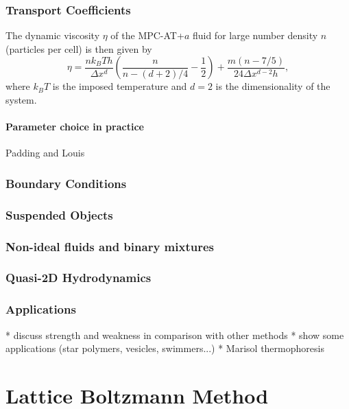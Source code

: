 \documentclass[8.5pt,twoside,twocolumn]{article}
\begin{document}
\subsubsection{Transport Coefficients}

The dynamic viscosity $\eta$ of the MPC-AT+$a$ fluid for large number density $n$ (particles per cell) is then given by
%
\begin{equation}
\eta = \frac{n k_BT h}{\Delta x^d} \left( \frac{n}{n-(d+2)/4}-\frac{1}{2} \right)
+ \frac{m (n-7/5)}{24 \Delta x^{d-2} h} ,
\end{equation}
%
where $k_BT$ is the imposed temperature and $d=2$ is the dimensionality of the system.


\paragraph{Parameter choice in practice}

Padding and Louis

\subsubsection{Boundary Conditions}
\subsubsection{Suspended Objects}
\subsubsection{Non-ideal fluids and binary mixtures}
\subsubsection{Quasi-2D Hydrodynamics}
\subsubsection{Applications}

* discuss strength and weakness in comparison with other methods
* show some applications (star polymers, vesicles, swimmers...)
* Marisol thermophoresis



\section{Lattice Boltzmann Method}
\end{document}
